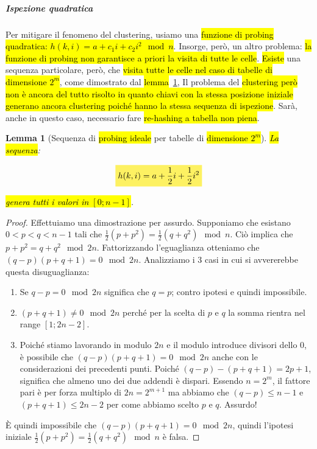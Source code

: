 \documentclass[a4paper,11pt,oneside]{article}
\theoremstyle{plain}
\newtheorem{lem}{Lemma}[section]
\theoremstyle{definition}
\theoremstyle{remark}
\newcommand{\mhl}[1]{\colorbox{hlcolor}{$\displaystyle #1$}}
\begin{document}
\subparagraph{Ispezione quadratica} Per mitigare il fenomeno del clustering,
usiamo una \hl{funzione di probing quadratica: $h(k,i) = a + c_1 i + c_2 i^2
\mod{n}$}. Insorge, però, un altro problema: \hl{la funzione di probing non
garantisce a priori la visita di tutte le celle}. \hl{Esiste} una sequenza
particolare, però, che \hl{visita tutte le celle nel caso di tabelle di
dimensione $2^m$}, come dimostrato dal \hl{lemma}~\ref{thm:tabelle-2-m}, Il
problema del \hl{clustering però non è ancora del tutto risolto in quanto chiavi
con la stessa posizione iniziale generano ancora clustering poiché hanno la
stessa sequenza di ispezione}. Sarà, anche in questo caso, necessario fare
\hl{re-hashing a tabella non piena}.

\begin{lem}[Sequenza di \hl{probing ideale} per tabelle di \hl{dimensione $2^m$}]\label{thm:tabelle-2-m}
  \hl{La sequenza}:

  \begin{equation}
    \mhl{
      h(k,i) = a + \frac{1}{2} i + \frac{1}{2} i^2
    }
  \end{equation}

  \hl{genera tutti i valori in $[0; n-1]$}.
\end{lem}
\begin{proof}
  Effettuiamo una dimostrazione per assurdo. Supponiamo che esistano $0 < p < q
  < n-1$ tali che $\frac{1}{2}(p + p^2) = \frac{1}{2}(q + q^2) \mod{n}$. Ciò
  implica che $p + p^2 = q + q^2 \mod{2n}$. Fattorizzando l'eguaglianza
  otteniamo che $(q-p)(p+q+1) = 0 \mod{2n}$. Analizziamo i 3 casi in cui si
  avvererebbe questa disuguaglianza:

  \begin{enumerate}
    \item Se $q - p = 0 \mod{2n}$ significa che $q = p$; contro ipotesi e quindi
      impossibile.
    \item $(p + q + 1) \neq 0 \mod{2n}$ perché per la scelta di $p$ e $q$ la
      somma rientra nel range $[1; 2n - 2]$.
    \item Poiché stiamo lavorando in modulo $2n$ e il modulo introduce divisori
      dello $0$, è possibile che $(q-p)(p+q+1) = 0 \mod{2n}$ anche con le
      considerazioni dei precedenti punti. Poiché $(q-p) - (p+q+1) = 2p + 1$,
      significa che almeno uno dei due addendi è dispari. Essendo $n = 2^m$, il
      fattore pari è per forza multiplo di $2n = 2^{m+1}$ ma abbiamo che $(q-p)
      \leq n-1$ e $(p+q+1) \leq 2n-2$ per come abbiamo scelto $p$ e $q$.
      Assurdo!
  \end{enumerate}

  È quindi impossibile che $(q-p)(p+q+1) = 0 \mod{2n}$, quindi l'ipotesi
  iniziale $\frac{1}{2}(p + p^2) = \frac{1}{2}(q + q^2) \mod{n}$ è falsa.
\end{proof}
\end{document}
